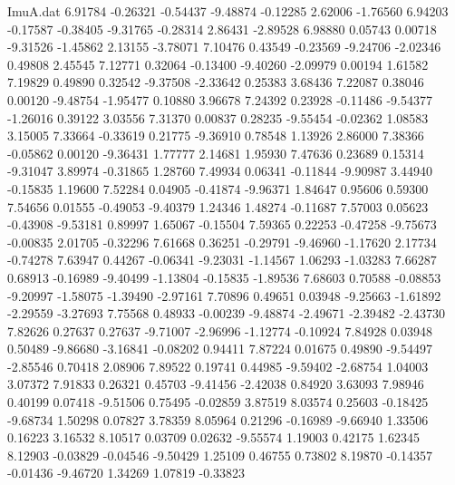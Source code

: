 \begin{filecontents}{ImuA.dat}
   6.91784   -0.26321   -0.54437   -9.48874   -0.12285    2.62006   -1.76560
   6.94203   -0.17587   -0.38405   -9.31765   -0.28314    2.86431   -2.89528
   6.98880    0.05743    0.00718   -9.31526   -1.45862    2.13155   -3.78071
   7.10476    0.43549   -0.23569   -9.24706   -2.02346    0.49808    2.45545
   7.12771    0.32064   -0.13400   -9.40260   -2.09979    0.00194    1.61582
   7.19829    0.49890    0.32542   -9.37508   -2.33642    0.25383    3.68436
   7.22087    0.38046    0.00120   -9.48754   -1.95477    0.10880    3.96678
   7.24392    0.23928   -0.11486   -9.54377   -1.26016    0.39122    3.03556
   7.31370    0.00837    0.28235   -9.55454   -0.02362    1.08583    3.15005
   7.33664   -0.33619    0.21775   -9.36910    0.78548    1.13926    2.86000
   7.38366   -0.05862    0.00120   -9.36431    1.77777    2.14681    1.95930
   7.47636    0.23689    0.15314   -9.31047    3.89974   -0.31865    1.28760
   7.49934    0.06341   -0.11844   -9.90987    3.44940   -0.15835    1.19600
   7.52284    0.04905   -0.41874   -9.96371    1.84647    0.95606    0.59300
   7.54656    0.01555   -0.49053   -9.40379    1.24346    1.48274   -0.11687
   7.57003    0.05623   -0.43908   -9.53181    0.89997    1.65067   -0.15504
   7.59365    0.22253   -0.47258   -9.75673   -0.00835    2.01705   -0.32296
   7.61668    0.36251   -0.29791   -9.46960   -1.17620    2.17734   -0.74278
   7.63947    0.44267   -0.06341   -9.23031   -1.14567    1.06293   -1.03283
   7.66287    0.68913   -0.16989   -9.40499   -1.13804   -0.15835   -1.89536
   7.68603    0.70588   -0.08853   -9.20997   -1.58075   -1.39490   -2.97161
   7.70896    0.49651    0.03948   -9.25663   -1.61892   -2.29559   -3.27693
   7.75568    0.48933   -0.00239   -9.48874   -2.49671   -2.39482   -2.43730
   7.82626    0.27637    0.27637   -9.71007   -2.96996   -1.12774   -0.10924
   7.84928    0.03948    0.50489   -9.86680   -3.16841   -0.08202    0.94411
   7.87224    0.01675    0.49890   -9.54497   -2.85546    0.70418    2.08906
   7.89522    0.19741    0.44985   -9.59402   -2.68754    1.04003    3.07372
   7.91833    0.26321    0.45703   -9.41456   -2.42038    0.84920    3.63093
   7.98946    0.40199    0.07418   -9.51506    0.75495   -0.02859    3.87519
   8.03574    0.25603   -0.18425   -9.68734    1.50298    0.07827    3.78359
   8.05964    0.21296   -0.16989   -9.66940    1.33506    0.16223    3.16532
   8.10517    0.03709    0.02632   -9.55574    1.19003    0.42175    1.62345
   8.12903   -0.03829   -0.04546   -9.50429    1.25109    0.46755    0.73802
   8.19870   -0.14357   -0.01436   -9.46720    1.34269    1.07819   -0.33823

\end{filecontents}
